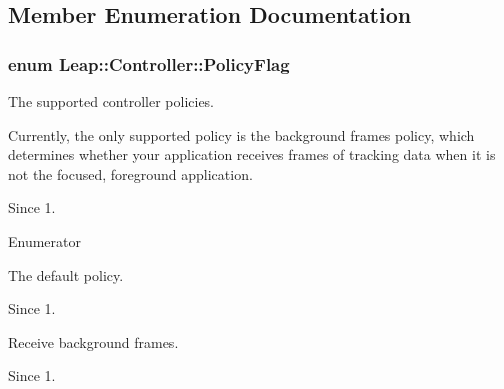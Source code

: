 \subsection{Member Enumeration Documentation}
\hypertarget{class_leap_1_1_controller_a0bdb49fa94aa2da8b098c1ac296528d6}{
\subsubsection[{Policy\+Flag}]{\setlength{\rightskip}{0pt plus 5cm}enum {\bf Leap\+::\+Controller\+::\+Policy\+Flag}}}\label{class_leap_1_1_controller_a0bdb49fa94aa2da8b098c1ac296528d6}
The supported controller policies.

Currently, the only supported policy is the background frames policy, which determines whether your application receives frames of tracking data when it is not the focused, foreground application. \begin{DoxySince}{Since}
1. 
\end{DoxySince}
\begin{Desc}
\item[Enumerator]\par
\begin{description}
\item[{\em 
\hypertarget{class_leap_1_1_controller_a0bdb49fa94aa2da8b098c1ac296528d6a94886192cfa6f6f94cd2e20b68aeca97}{P\+O\+L\+I\+C\+Y\+\_\+\+D\+E\+F\+A\+U\+L\+T}\label{class_leap_1_1_controller_a0bdb49fa94aa2da8b098c1ac296528d6a94886192cfa6f6f94cd2e20b68aeca97}
}]The default policy. \begin{DoxySince}{Since}
1. 
\end{DoxySince}
\item[{\em 
\hypertarget{class_leap_1_1_controller_a0bdb49fa94aa2da8b098c1ac296528d6a1e34f1992444deee3b4c905d2a765329}{P\+O\+L\+I\+C\+Y\+\_\+\+B\+A\+C\+K\+G\+R\+O\+U\+N\+D\+\_\+\+F\+R\+A\+M\+E\+S}\label{class_leap_1_1_controller_a0bdb49fa94aa2da8b098c1ac296528d6a1e34f1992444deee3b4c905d2a765329}
}]Receive background frames. \begin{DoxySince}{Since}
1. 
\end{DoxySince}
\end{description}
\end{Desc}


